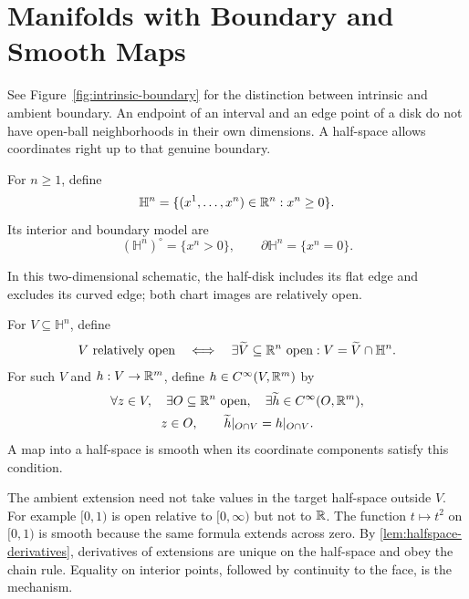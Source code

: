\section{Manifolds with Boundary and Smooth Maps}
\label{sec:boundary-smooth-maps}
See Figure~\ref{fig:intrinsic-boundary} for the distinction between intrinsic and ambient boundary.
An endpoint of an interval and an edge point of a disk do not have open-ball
neighborhoods in their own dimensions. A half-space allows coordinates
right up to that genuine boundary.
\begin{definition}
For $n\geq1$, define
\[
\mathbb H^n=\{(x^1,\ldots,x^n)\in\mathbb{R}^n:x^n\geq0\}.
\]
Its interior and boundary model are
\[
(\mathbb H^n)^\circ=\{x^n>0\},\qquad \partial\mathbb H^n=\{x^n=0\}.
\]
\end{definition}
\begin{center}
\end{center}
In this two-dimensional schematic, the half-disk includes its flat edge
and excludes its curved edge; both chart images are relatively open.


\begin{definition}
For $V\subseteq\mathbb H^n$, define
\[
V\text{ relatively open}\quad\Longleftrightarrow\quad
\exists\widetilde V\subseteq\mathbb{R}^n\text{ open}:V=\widetilde V\cap\mathbb H^n.
\]
For such $V$ and $h:V\to\mathbb{R}^m$, define $h\in C^\infty(V,\mathbb{R}^m)$ by
\[
\begin{gathered}
\forall z\in V,\quad\exists O\subseteq\mathbb{R}^n\text{ open},\quad
\exists\widetilde h\in C^\infty(O,\mathbb{R}^m),\\
z\in O,\qquad \widetilde h|_{O\cap V}=h|_{O\cap V}.
\end{gathered}
\]
A map into a half-space is smooth when its coordinate components satisfy
this condition.
\end{definition}
The ambient extension need not take values in the target half-space
outside $V$. For example $[0,1)$ is open relative to $[0,\infty)$ but not to $\mathbb{R}$.
The function $t\mapsto t^2$ on $[0,1)$ is smooth because the same formula
extends across zero. By \cref{lem:halfspace-derivatives}, derivatives of
extensions are unique on the half-space and obey the chain rule. Equality
on interior points, followed by continuity to the face, is the mechanism.

